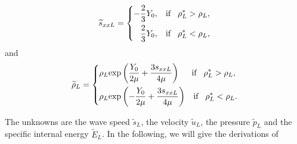 \documentclass{article}
\numberwithin{equation}{section}
\numberwithin{table}{section}
\begin{document}
\begin{equation}
  \widetilde{s}_{xxL} =\left\{ \begin{aligned}
	  -\frac{2}{3}Y_0, \hspace{0.3cm} \text{if} \hspace{0.3cm} \rho_L^* > \rho_L,\\
	  \frac{2}{3}Y_0, \hspace{0.3cm} \text{if} \hspace{0.3cm} \rho_L^* < \rho_L,\\
	\end{aligned}\right.
  \end{equation}
  and
\begin{equation}   \widetilde{\rho}_{L} = \left\{ \begin{aligned}
	  & \rho_L \text{exp}\left(\frac{Y_0}{2\mu}+\frac{3 s_{xxL}}{4\mu}\right)  \hspace{0.5cm} \text{if} \hspace{0.3cm} \rho_L^* > \rho_L,\\ 
& \rho_L \text{exp}\left(-\frac{Y_0}{2\mu}+\frac{3 s_{xxL}}{4\mu}\right) 
\hspace{0.3cm} \text{if} \hspace{0.3cm} \rho_L^* < \rho_L.\\ 
  \end{aligned}\right.
 \end{equation}

 The unknowns are the wave speed $\widetilde{s}_L$,  the velocity  $\widetilde{u}_L$, the pressure $\widetilde{p}_L$ and the specific internal energy $\widetilde{E}_L$. In the following, we will give the derivations of   
\end{document}
